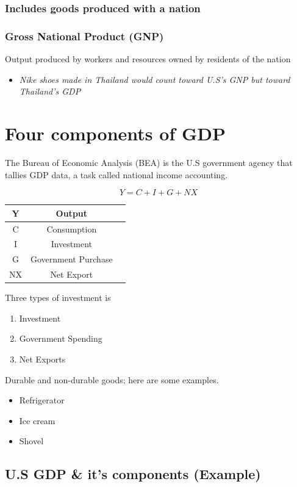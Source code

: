\documentclass[12pt]{article} %
\begin{document}
\subsubsection*{Includes goods produced with a nation}
\subsubsection*{Gross National Product (GNP)}
Output produced by workers and resources owned by residents of the nation
\begin{itemize}
	\item{\textit{Nike shoes made in Thailand would count toward U.S's GNP but toward Thailand's GDP}}
\end{itemize}

\section{Four components of GDP}
The Bureau of Economic Analysis (BEA) is the U.S government agency that tallies GDP data, a task called national income accounting.
\begin{center}
\begin{equation}
Y=C+I+G+NX
\end{equation}
\begin{tabular}{|c|c|c|}
	\hline
	Y & Output \\
	\hline
	C & Consumption \\
	\hline
	I & Investment \\
	\hline
	G & Government Purchase \\
	\hline
	NX & Net Export \\
	\hline
\end{tabular}
\end{center}

Three types of investment is
\begin{enumerate}
	\item Investment
	\item Government Spending
	\item Net Exports \\
\end{enumerate}
Durable and non-durable goods; here are some examples.
\begin{itemize}
	\item Refrigerator
	\item Ice cream
	\item Shovel
\end{itemize}

\subsection{U.S GDP \& it's components (Example)}
\end{document}
